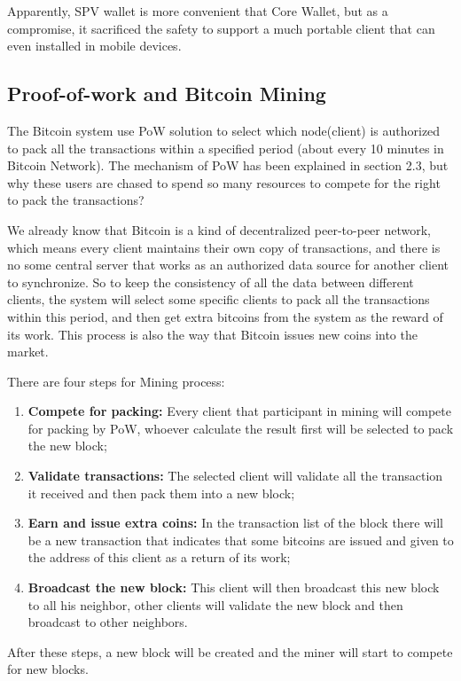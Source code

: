 \documentclass[runningheads]{llncs}
\begin{document}
Apparently, SPV wallet is more convenient that Core Wallet, but as a compromise, it sacrificed the safety to support a much portable client that can even installed in mobile devices.


\subsection{Proof-of-work and Bitcoin Mining}

The Bitcoin system use PoW solution to select which node(client) is authorized to pack all the transactions within a specified period (about every 10 minutes\cite{nakamoto2008bitcoin} in Bitcoin Network). The mechanism of PoW has been explained in section 2.3, but why these users are chased to spend so many resources to compete for the right to pack the transactions?

We already know that Bitcoin is a kind of decentralized peer-to-peer network, which means every client maintains their own copy of transactions, and there is no some central server that works as an authorized data source for another client to synchronize. So to keep the consistency of all the data between different clients, the system will select some specific clients to pack all the transactions within this period, and then get extra bitcoins from the system as the reward of its work. This process is also the way that Bitcoin issues new coins into the market.

There are four steps for Mining process:
\begin{enumerate}
	\item \textbf{Compete for packing:} Every client that participant in mining will compete for packing by PoW, whoever calculate the result first will be selected to pack the new block;
	\item \textbf{Validate transactions:} The selected client will validate all the transaction it received and then pack them into a new block;
	\item \textbf{Earn and issue extra coins:} In the transaction list of the block there will be a new transaction that indicates that some bitcoins are issued and given to the address of this client as a return of its work;
	\item \textbf{Broadcast the new block:} This client will then broadcast this new block to all his neighbor, other clients will validate the new block and then broadcast to other neighbors.
\end{enumerate}

After these steps, a new block will be created and the miner will start to compete for new blocks.
\end{document}
